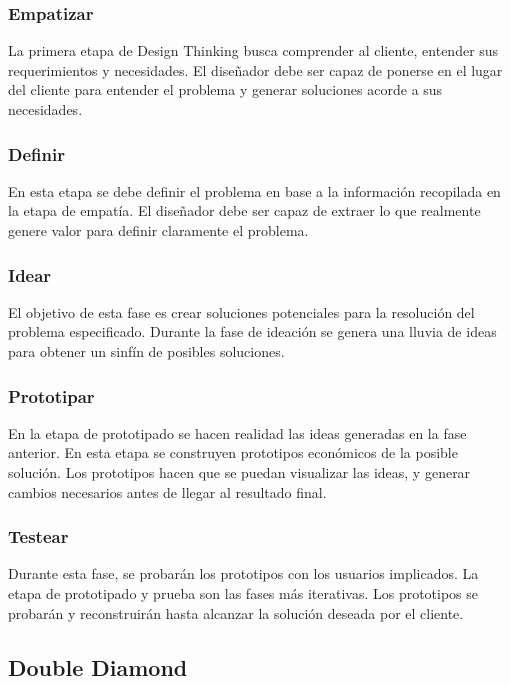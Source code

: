 \subsubsection{Empatizar} 

La primera etapa de Design Thinking busca comprender al cliente, entender sus requerimientos y necesidades. El diseñador debe ser capaz de ponerse en el lugar del cliente para entender el problema y generar soluciones acorde a sus necesidades. 

\subsubsection{Definir} 

En esta etapa se debe definir el problema en base a la información recopilada en la etapa de empatía. El diseñador debe ser capaz de extraer lo que realmente genere valor para definir claramente el problema.  

\subsubsection{Idear} 
 
El objetivo de esta fase es crear soluciones potenciales para la resolución del problema especificado. Durante la fase de ideación se genera una lluvia de ideas para obtener un sinfín de posibles soluciones. 

\subsubsection{Prototipar} 
 
En la etapa de prototipado se hacen realidad las ideas generadas en la fase anterior. En esta etapa se construyen prototipos económicos de la posible solución. Los prototipos hacen que se puedan visualizar las ideas, y generar cambios necesarios antes de llegar al resultado final. 

\subsubsection{Testear} 
 
Durante esta fase, se probarán los prototipos con los usuarios implicados. La etapa de prototipado y prueba son las fases más iterativas. Los prototipos se probarán  y reconstruirán hasta alcanzar la solución deseada por el cliente. 

\subsection{Double Diamond}

